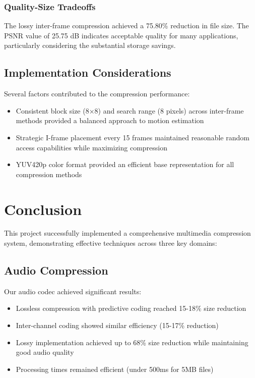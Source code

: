 \documentclass[a4paper,14pt]{article}
\begin{document}
\subsubsection{Quality-Size Tradeoffs}
The lossy inter-frame compression achieved a 75.80\% reduction in file size. The PSNR value of 25.75 dB indicates acceptable quality for many applications, particularly considering the substantial storage savings.

\subsection{Implementation Considerations}
Several factors contributed to the compression performance:
\begin{itemize}
    \item Consistent block size (8×8) and search range (8 pixels) across inter-frame methods provided a balanced approach to motion estimation
    \item Strategic I-frame placement every 15 frames maintained reasonable random access capabilities while maximizing compression
    \item YUV420p color format provided an efficient base representation for all compression methods
\end{itemize}


\section{Conclusion}
This project successfully implemented a comprehensive multimedia compression system, demonstrating effective techniques across three key domains:

\subsection{Audio Compression}
Our audio codec achieved significant results:
\begin{itemize}
    \item Lossless compression with predictive coding reached 15-18\% size reduction
    \item Inter-channel coding showed similar efficiency (15-17\% reduction)
    \item Lossy implementation achieved up to 68\% size reduction while maintaining good audio quality
    \item Processing times remained efficient (under 500ms for 5MB files)
\end{itemize}
\end{document}
